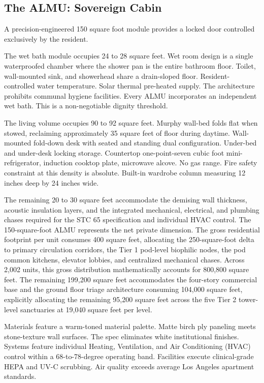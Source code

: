 \documentclass[12pt, letterpaper]{article}
\begin{document}
\subsection{The ALMU: Sovereign Cabin}

A precision-engineered 150 square foot module provides a locked door controlled exclusively by the resident.

The wet bath module occupies 24 to 28 square feet. Wet room design is a single waterproofed chamber where the shower pan is the entire bathroom floor. Toilet, wall-mounted sink, and showerhead share a drain-sloped floor. Resident-controlled water temperature. Solar thermal pre-heated supply. The architecture prohibits communal hygiene facilities. Every ALMU incorporates an independent wet bath. This is a non-negotiable dignity threshold.

The living volume occupies 90 to 92 square feet. Murphy wall-bed folds flat when stowed, reclaiming approximately 35 square feet of floor during daytime. Wall-mounted fold-down desk with seated and standing dual configuration. Under-bed and under-desk locking storage. Countertop one-point-seven cubic foot mini-refrigerator, induction cooktop plate, microwave alcove. No gas range. Fire safety constraint at this density is absolute. Built-in wardrobe column measuring 12 inches deep by 24 inches wide.

The remaining 20 to 30 square feet accommodate the demising wall thickness, acoustic insulation layers, and the integrated mechanical, electrical, and plumbing chases required for the STC 65 specification and individual HVAC control. The 150-square-foot ALMU represents the net private dimension. The gross residential footprint per unit consumes 400 square feet, allocating the 250-square-foot delta to primary circulation corridors, the Tier 1 pod-level biophilic nodes, the pod common kitchens, elevator lobbies, and centralized mechanical chases. Across 2,002 units, this gross distribution mathematically accounts for 800,800 square feet. The remaining 199,200 square feet accommodates the four-story commercial base and the ground floor triage architecture consuming 104,000 square feet, explicitly allocating the remaining 95,200 square feet across the five Tier 2 tower-level sanctuaries at 19,040 square feet per level.

Materials feature a warm-toned material palette. Matte birch ply paneling meets stone-texture wall surfaces. The spec eliminates white institutional finishes. Systems feature individual Heating, Ventilation, and Air Conditioning (HVAC) control within a 68-to-78-degree operating band. Facilities execute clinical-grade HEPA and UV-C scrubbing. Air quality exceeds average Los Angeles apartment standards.
\end{document}
